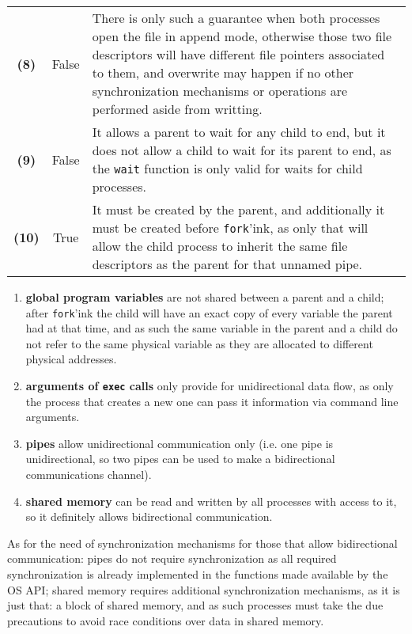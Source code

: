 \documentclass{sope}
\begin{document}
\begin{center}
\begin{longtable}{c | c p{132mm}}
        \textbf{(8)} & False & There is only such a guarantee when both processes open the file in append mode, otherwise those two file descriptors will have different file pointers associated to them, and overwrite may happen if no other synchronization mechanisms or operations are performed aside from writting. \\
        \textbf{(9)} & False & It allows a parent to wait for any child to end, but it does not allow a child to wait for its parent to end, as the \texttt{wait} function is only valid for waits for child processes. \\
        \textbf{(10)} & True & It must be created by the parent, and additionally it must be created before \texttt{fork}'ink, as only that will allow the child process to inherit the same file descriptors as the parent for that unnamed pipe.
    \end{longtable}
\end{center}

\begin{enumerate}[label=\alph*)]
    \item \textbf{global program variables} are not shared between a parent and a child; after \texttt{fork}'ink the child will have an exact copy of every variable the parent had at that time, and as such the same variable in the parent and a child do not refer to the same physical variable as they are allocated to different physical addresses.
    \item \textbf{arguments of \texttt{exec} calls} only provide for unidirectional data flow, as only the process that creates a new one can pass it information via command line arguments.
    \item \textbf{pipes} allow unidirectional communication only (i.e. one pipe is unidirectional, so two pipes can be used to make a bidirectional communications channel).
    \item \textbf{shared memory} can be read and written by all processes with access to it, so it definitely allows bidirectional communication.
\end{enumerate}

As for the need of synchronization mechanisms for those that allow bidirectional communication: pipes do not require synchronization as all required synchronization is already implemented in the functions made available by the OS API; shared memory requires additional synchronization mechanisms, as it is just that: a block of shared memory, and as such processes must take the due precautions to avoid race conditions over data in shared memory.
\end{document}
